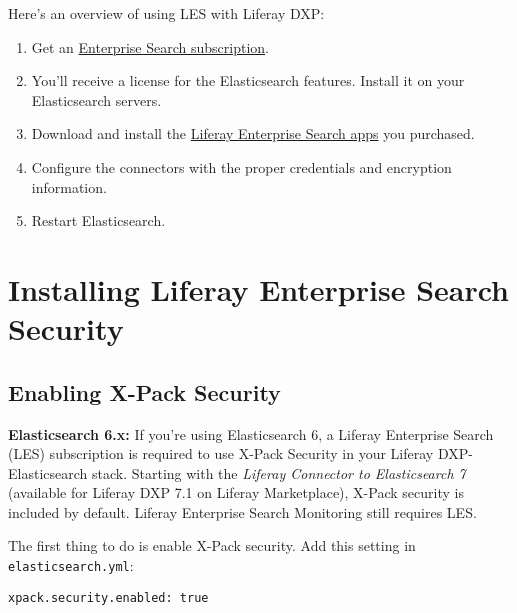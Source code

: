 Here's an overview of using LES with Liferay DXP:

\begin{enumerate}
\def\labelenumi{\arabic{enumi}.}
\item
  Get an
  \href{https://help.liferay.com/hc/en-us/articles/360014400932}{Enterprise
  Search subscription}.
\item
  You'll receive a license for the Elasticsearch features. Install it on
  your Elasticsearch servers.
\item
  Download and install the
  \href{https://customer.liferay.com/downloads?p_p_id=com_liferay_osb_customer_downloads_display_web_DownloadsDisplayPortlet&_com_liferay_osb_customer_downloads_display_web_DownloadsDisplayPortlet_productAssetCategoryId=118191013&_com_liferay_osb_customer_downloads_display_web_DownloadsDisplayPortlet_fileTypeAssetCategoryId=118191060}{Liferay
  Enterprise Search apps} you purchased.
\item
  Configure the connectors with the proper credentials and encryption
  information.
\item
  Restart Elasticsearch.
\end{enumerate}

\chapter{Installing Liferay Enterprise Search
Security}\label{installing-liferay-enterprise-search-security}

\section{Enabling X-Pack Security}\label{enabling-x-pack-security}

\noindent\hrulefill

\textbf{Elasticsearch 6.x:} If you're using Elasticsearch 6, a Liferay
Enterprise Search (LES) subscription is required to use X-Pack Security
in your Liferay DXP-Elasticsearch stack. Starting with the \emph{Liferay
Connector to Elasticsearch 7} (available for Liferay DXP 7.1 on Liferay
Marketplace), X-Pack security is included by default. Liferay Enterprise
Search Monitoring still requires LES.

\noindent\hrulefill

The first thing to do is enable X-Pack security. Add this setting in
\texttt{elasticsearch.yml}:

\begin{verbatim}
xpack.security.enabled: true
\end{verbatim}

